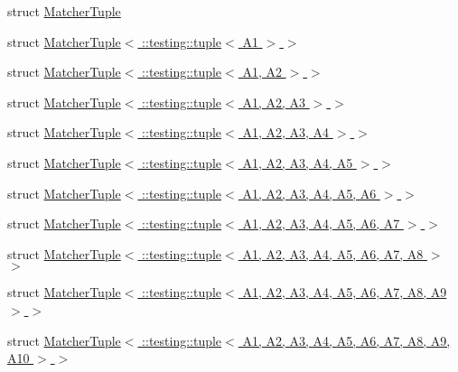 \begin{DoxyCompactItemize}
struct \hyperlink{structtesting_1_1internal_1_1MatcherTuple}{Matcher\+Tuple}
\item 
struct \hyperlink{structtesting_1_1internal_1_1MatcherTuple_3_01_1_1testing_1_1tuple_3_01A1_01_4_01_4}{Matcher\+Tuple$<$ \+::testing\+::tuple$<$ A1 $>$ $>$}
\item 
struct \hyperlink{structtesting_1_1internal_1_1MatcherTuple_3_01_1_1testing_1_1tuple_3_01A1_00_01A2_01_4_01_4}{Matcher\+Tuple$<$ \+::testing\+::tuple$<$ A1, A2 $>$ $>$}
\item 
struct \hyperlink{structtesting_1_1internal_1_1MatcherTuple_3_01_1_1testing_1_1tuple_3_01A1_00_01A2_00_01A3_01_4_01_4}{Matcher\+Tuple$<$ \+::testing\+::tuple$<$ A1, A2, A3 $>$ $>$}
\item 
struct \hyperlink{structtesting_1_1internal_1_1MatcherTuple_3_01_1_1testing_1_1tuple_3_01A1_00_01A2_00_01A3_00_01A4_01_4_01_4}{Matcher\+Tuple$<$ \+::testing\+::tuple$<$ A1, A2, A3, A4 $>$ $>$}
\item 
struct \hyperlink{structtesting_1_1internal_1_1MatcherTuple_3_01_1_1testing_1_1tuple_3_01A1_00_01A2_00_01A3_00_01A4_00_01A5_01_4_01_4}{Matcher\+Tuple$<$ \+::testing\+::tuple$<$ A1, A2, A3, A4, A5 $>$ $>$}
\item 
struct \hyperlink{structtesting_1_1internal_1_1MatcherTuple_3_01_1_1testing_1_1tuple_3_01A1_00_01A2_00_01A3_00_01A4_00_01A5_00_01A6_01_4_01_4}{Matcher\+Tuple$<$ \+::testing\+::tuple$<$ A1, A2, A3, A4, A5, A6 $>$ $>$}
\item 
struct \hyperlink{structtesting_1_1internal_1_1MatcherTuple_3_01_1_1testing_1_1tuple_3_01A1_00_01A2_00_01A3_00_01A63c742e825c64dbe2671b0a407b3db47}{Matcher\+Tuple$<$ \+::testing\+::tuple$<$ A1, A2, A3, A4, A5, A6, A7 $>$ $>$}
\item 
struct \hyperlink{structtesting_1_1internal_1_1MatcherTuple_3_01_1_1testing_1_1tuple_3_01A1_00_01A2_00_01A3_00_01Aed2bba98e2ef5f11a8df3506707ec6d8}{Matcher\+Tuple$<$ \+::testing\+::tuple$<$ A1, A2, A3, A4, A5, A6, A7, A8 $>$ $>$}
\item 
struct \hyperlink{structtesting_1_1internal_1_1MatcherTuple_3_01_1_1testing_1_1tuple_3_01A1_00_01A2_00_01A3_00_01Aa73012c63a4e11ec83732b0fb70972c7}{Matcher\+Tuple$<$ \+::testing\+::tuple$<$ A1, A2, A3, A4, A5, A6, A7, A8, A9 $>$ $>$}
\item 
struct \hyperlink{structtesting_1_1internal_1_1MatcherTuple_3_01_1_1testing_1_1tuple_3_01A1_00_01A2_00_01A3_00_01Aa256ea461b02eca0db9561b7bbf2c82d}{Matcher\+Tuple$<$ \+::testing\+::tuple$<$ A1, A2, A3, A4, A5, A6, A7, A8, A9, A10 $>$ $>$}
\item 

\end{DoxyCompactItemize}
